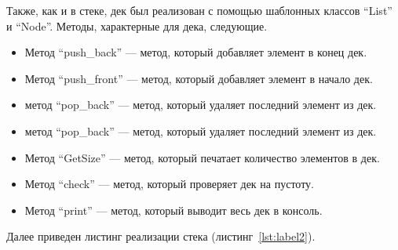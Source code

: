 \documentclass[12pt, a4paper]{article}
\begin{document}
Также, как и в стеке, дек был реализован с помощью шаблонных классов ``List'' и ``Node''. Методы, характерные для дека, следующие.
\begin{itemize}
    \item[---] Метод ``push\_back'' --- метод, который добавляет элемент в конец дек.
    \item[---] Метод ``push\_front'' --- метод, который добавляет элемент в начало дек.
    \item[---] метод ``pop\_back'' --- метод, который удаляет последний элемент из дек.
    \item[---] метод ``pop\_back'' --- метод, который удаляет последний элемент из дек.
    \item[---] Метод ``GetSize'' --- метод, который печатает количество элементов в дек.
    \item[---] Метод ``check'' --- метод, который проверяет дек на пустоту.
    \item[---] Метод ``print'' --- метод, который выводит весь дек в консоль.
\end{itemize}
Далее приведен листинг реализации стека (листинг~\ref{lst:label2}).
\end{document}
